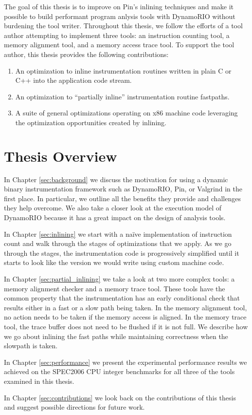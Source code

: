 The goal of this thesis is to improve on Pin's inlining techniques and make it
possible to build performant program anlysis tools with DynamoRIO without
burdening the tool writer.  Throughout this thesis, we follow the efforts of a
tool author attempting to implement three tools: an instruction counting tool, a
memory alignment tool, and a memory access trace tool.  To support the tool
author, this thesis provides the following contributions:

\begin{enumerate}
\item An optimization to inline instrumentation routines written in plain C or
C++ into the application code stream.
\item An optimization to ``partially inline'' instrumentation routine fastpaths.
\item A suite of general optimizations operating on x86 machine code leveraging
the optimization opportunities created by inlining.
\end{enumerate}

\section{Thesis Overview}

In Chapter \ref{sec:background} we discuss the motivation for using a dynamic
binary instrumentation framework such as DynamoRIO, Pin, or Valgrind in the
first place.  In particular, we outline all the benefits they provide and
challenges they help overcome.  We also take a closer look at the execution
model of DynamoRIO because it has a great impact on the design of analysis
tools.

In Chapter \ref{sec:inlining} we start with a na\"ive implementation of
instruction count and walk through the stages of optimizations that we apply.
As we go through the stages, the instrumentation code is progressively
simplified until it starts to look like the version we would write using custom
machine code.

In Chapter \ref{sec:partial_inlining} we take a look at two more complex tools:
a memory alignment checker and a memory trace tool.  These tools have the common
property that the instrumentation has an early conditional check that results
either in a fast or a slow path being taken.  In the memory alignment tool, no
action needs to be taken if the memory access is aligned.  In the memory trace
tool, the trace buffer does not need to be flushed if it is not full.  We
describe how we go about inlining the fast paths while maintaining correctness
when the slowpath is taken.

In Chapter \ref{sec:performance} we present the experimental performance results
we achieved on the SPEC2006 CPU integer benchmarks\cite{spec_cpu_2k6} for all
three of the tools examined in this thesis.

In Chapter \ref{sec:contributions} we look back on the contributions of this
thesis and suggest possible directions for future work.
